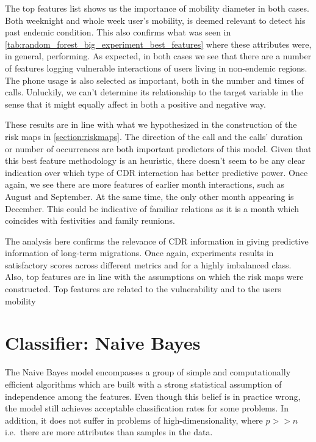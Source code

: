 The top features list shows us the importance of mobility diameter in both cases.
Both weeknight and whole week user's mobility, is deemed relevant to detect his past endemic condition.
This also confirms what was seen in \cref{tab:random_forest_big_experiment_best_features} where these attributes were, in general, performing.
As expected, in both cases we see that there are a number of features logging vulnerable interactions of users living in non-endemic regions.
The phone usage is also selected as important, both in the number and times of calls.
Unluckily, we can't determine its relationship to the target variable in the sense that it might equally affect in both a positive and negative way.

These results are in line with what we hypothesized in the construction of the risk maps in \cref{section:riskmaps}.
The direction of the call and the calls' duration or number of occurrences are both important predictors of this model.
Given that this best feature methodology is an heuristic, there doesn't seem to be any clear indication over which type of CDR interaction has better predictive power.
Once again, we see there are more features of earlier month interactions, such as August and September.
At the same time, the only other month appearing is December.
This could be indicative of familiar relations as it is a month which coincides with festivities and family reunions.

The analysis here confirms the relevance of CDR information in giving predictive information of long-term migrations.
Once again, experiments results in satisfactory scores across different metrics and for a highly imbalanced class.
Also, top features are in line with the assumptions on which the risk maps were constructed.
Top features are related to the vulnerability and to the users mobility



\section{Classifier: Naive Bayes}

The Naive Bayes model encompasses a group of simple and computationally efficient algorithms which are built with a strong statistical assumption of independence among the features. Even though this belief is in practice wrong, the model still achieves acceptable classification rates for some problems. In addition, it does not suffer in problems of high-dimensionality, where $p >> n$ i.e.\ there are more attributes than samples in the data.

